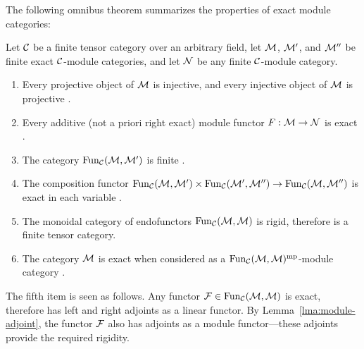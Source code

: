 \documentclass{amsart}
\begin{document}
The following omnibus theorem summarizes the properties of exact module categories: 
\begin{theorem} \label{Thm:ExactModCatOmnibus}
	Let $\mathcal C$ be a finite tensor category over an arbitrary field, let $\mathcal M$, $\mathcal M'$, and $\mathcal M''$ be finite exact $\mathcal C$-module categories, and let $\mathcal N$ be any finite $\mathcal C$-module category.
	\begin{enumerate}
		\item Every projective object of $\mathcal M$ is injective, and every injective object of $\mathcal M$ is projective \cite[Cor. 3.6]{EO-ftc} \cite[Cor 2.7.4]{EGNO}.
		\item Every additive (not a priori right exact) module functor $F:\mathcal M \to \mathcal N$ is exact \cite[Prop. 3.11]{EO-ftc} \cite[Prop 2.7.8]{EGNO}.		
		\item The category $\operatorname{Fun}_{\mathcal C}(\mathcal M, \mathcal M')$ is finite \cite[Prop 2.13.5]{EGNO}. %
		\item The composition functor $\operatorname{Fun}_{\mathcal C}(\mathcal M, \mathcal M') \times \operatorname{Fun}_{\mathcal C}(\mathcal M', \mathcal M'') \to \operatorname{Fun}_{\mathcal C}(\mathcal M, \mathcal M'')$ is exact in each variable \cite[Lemma 3.20]{EO-ftc} \cite[Lemma 2.13.2]{EGNO}.	
		\item The monoidal category of endofunctors $\operatorname{Fun}_{\mathcal C}(\mathcal M,\mathcal M)$ is rigid, therefore is a finite tensor category.
		\item The category $\mathcal M$ is exact when considered as a $\operatorname{Fun}_{\mathcal C}(\mathcal M,\mathcal M)^{\mathrm{mp}}$-module category \cite[Lemma 3.25]{EO-ftc}.
	\end{enumerate}
\end{theorem}

\nid The fifth item is seen as follows.  Any functor $\mathcal F \in \operatorname{Fun}_\mathcal C(\mathcal M,\mathcal M)$ is exact, therefore has left and right adjoints as a linear functor.  By Lemma~\ref{lma:module-adjoint}, the functor $\mathcal F$ also has adjoints as a module functor---these adjoints provide the required rigidity.
\end{document}
